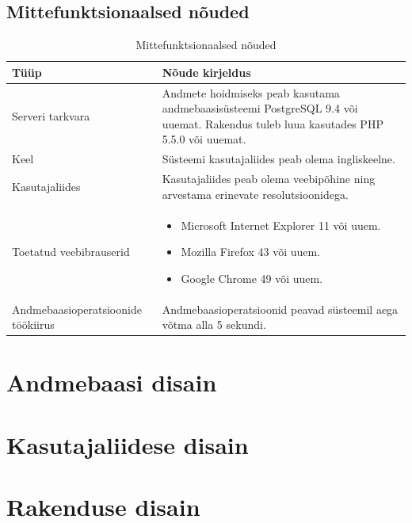 \documentclass[a4paper,12pt]{article} %
\begin{document}
\subsection{Mittefunktsionaalsed nõuded}
\begin{table}[H]%
\begin{center}
\begin{tabular}{|p{5cm}|p{10cm}|}
\hline
\rowcolor{rowgray}
Tüüp & Nõude kirjeldus \\ \hline

Serveri tarkvara & Andmete hoidmiseks peab kasutama andmebaasisüsteemi PostgreSQL 9.4 või uuemat. Rakendus tuleb luua kasutades PHP 5.5.0 või uuemat. \\ \hline

Keel & Süsteemi kasutajaliides peab olema ingliskeelne. \\ \hline

Kasutajaliides & Kasutajaliides peab olema veebipõhine ning arvestama erinevate resolutsioonidega. \\ \hline
 
Toetatud veebibrauserid & 
\begin{itemize}
\item Microsoft Internet Explorer 11 või uuem.
\item Mozilla Firefox 43 või uuem.
\item Google Chrome 49 või uuem.
\end{itemize}
 \\ \hline

Andmebaasioperatsioonide töökiirus & Andmebaasioperatsioonid peavad süsteemil aega võtma alla 5 sekundi. \\ \hline

\end{tabular}
\caption{Mittefunktsionaalsed nõuded}
\label{mittefunktsionaalsed_nõuded}
\end{center}
\end{table}


\section{Andmebaasi disain}
\section{Kasutajaliidese disain}
\section{Rakenduse disain}
\end{document}
